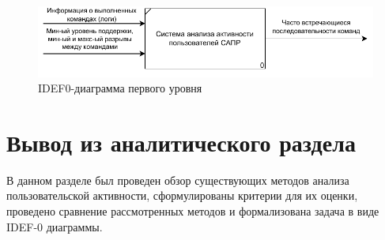 \begin{figure}[h!]
	\centering
	\includegraphics[width=1.0\textwidth]{inc/img/IDEF0.drawio.pdf}
	\caption{IDEF0-диаграмма первого уровня}
	\label{idef0}
\end{figure}

\section*{Вывод из аналитического раздела}

В данном разделе был проведен обзор существующих методов анализа пользовательской активности, сформулированы критерии для их оценки, проведено сравнение рассмотренных методов и формализована задача в виде IDEF-0 диаграммы.